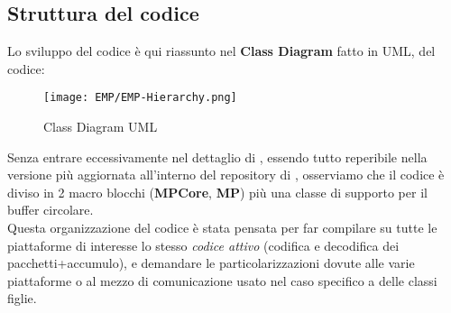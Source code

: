 \newpage
\subsection{Struttura del codice}
Lo sviluppo del codice è qui riassunto nel \textbf{Class Diagram} fatto in UML, del codice:
\begin{figure}[H]
	\centering
	\caption[Class Diagram UML di EMP]{Class Diagram UML}
	\texttt{[image: EMP/EMP-Hierarchy.png]}
\end{figure}
\noindent
Senza entrare eccessivamente nel dettaglio di , essendo tutto reperibile nella versione più aggiornata all'interno del repository di \cite*{EMP}, osserviamo che il codice è diviso in 2 macro blocchi (\textbf{MPCore}, \textbf{MP}) più una classe di supporto per il buffer circolare.\\
Questa organizzazione del codice è stata pensata per far compilare su tutte le piattaforme di interesse lo stesso \textit{codice attivo} (codifica e decodifica dei pacchetti+accumulo), e demandare le particolarizzazioni dovute alle varie piattaforme o al mezzo di comunicazione usato nel caso specifico a delle classi figlie.\\
